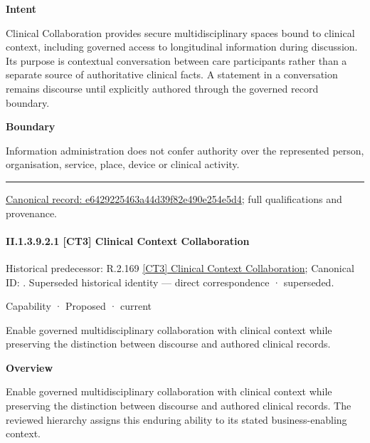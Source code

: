\textbf{Intent}



Clinical Collaboration provides secure multidisciplinary spaces bound to clinical context, including governed access to longitudinal information during discussion. Its purpose is contextual conversation between care participants rather than a separate source of authoritative clinical facts. A statement in a conversation remains discourse until explicitly authored through the governed record boundary.



\textbf{Boundary}



Information administration does not confer authority over the represented person, organisation, service, place, device or clinical activity.



\medskip\hrule\medskip

{\footnotesize \href{../../../../continuum/strategy/capability/e6429225463a44d39f82e490e254e5d4.md}{Canonical record: e6429225463a44d39f82e490e254e5d4}; full qualifications and provenance.}\par
\paragraph*{II.1.3.9.2.1 [CT3] Clinical Context Collaboration}
\label{navigation:II.1.3.9.2.1}

{\small Historical predecessor: R.2.169 \hyperref[element:750ef0d8e1504a8e9a1fde9bf13a6d0c]{[CT3] Clinical Context Collaboration}; Canonical ID: \texttt{}. Superseded historical identity — direct correspondence · superseded.}\par
\label{element:f11617eed6ff4d6fa237644ec95b28b2}
{\small Capability · Proposed · current}\par

Enable governed multidisciplinary collaboration with clinical context while preserving the distinction between discourse and authored clinical records.



\textbf{Overview}



Enable governed multidisciplinary collaboration with clinical context while preserving the distinction between discourse and authored clinical records. The reviewed hierarchy assigns this enduring ability to its stated business-enabling context.



